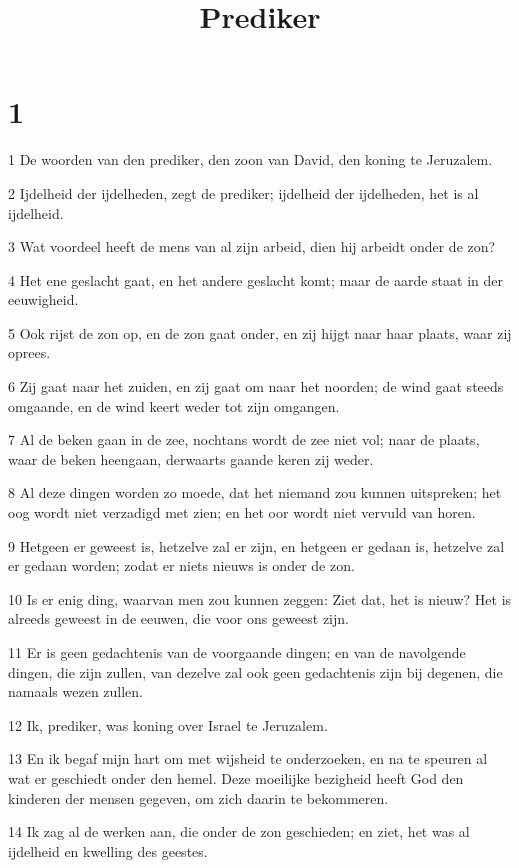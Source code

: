 

\title{Prediker}



\chapter{1}

\par 1 De woorden van den prediker, den zoon van David, den koning te Jeruzalem.
\par 2 Ijdelheid der ijdelheden, zegt de prediker; ijdelheid der ijdelheden, het is al ijdelheid.
\par 3 Wat voordeel heeft de mens van al zijn arbeid, dien hij arbeidt onder de zon?
\par 4 Het ene geslacht gaat, en het andere geslacht komt; maar de aarde staat in der eeuwigheid.
\par 5 Ook rijst de zon op, en de zon gaat onder, en zij hijgt naar haar plaats, waar zij oprees.
\par 6 Zij gaat naar het zuiden, en zij gaat om naar het noorden; de wind gaat steeds omgaande, en de wind keert weder tot zijn omgangen.
\par 7 Al de beken gaan in de zee, nochtans wordt de zee niet vol; naar de plaats, waar de beken heengaan, derwaarts gaande keren zij weder.
\par 8 Al deze dingen worden zo moede, dat het niemand zou kunnen uitspreken; het oog wordt niet verzadigd met zien; en het oor wordt niet vervuld van horen.
\par 9 Hetgeen er geweest is, hetzelve zal er zijn, en hetgeen er gedaan is, hetzelve zal er gedaan worden; zodat er niets nieuws is onder de zon.
\par 10 Is er enig ding, waarvan men zou kunnen zeggen: Ziet dat, het is nieuw? Het is alreeds geweest in de eeuwen, die voor ons geweest zijn.
\par 11 Er is geen gedachtenis van de voorgaande dingen; en van de navolgende dingen, die zijn zullen, van dezelve zal ook geen gedachtenis zijn bij degenen, die namaals wezen zullen.
\par 12 Ik, prediker, was koning over Israel te Jeruzalem.
\par 13 En ik begaf mijn hart om met wijsheid te onderzoeken, en na te speuren al wat er geschiedt onder den hemel. Deze moeilijke bezigheid heeft God den kinderen der mensen gegeven, om zich daarin te bekommeren.
\par 14 Ik zag al de werken aan, die onder de zon geschieden; en ziet, het was al ijdelheid en kwelling des geestes.
